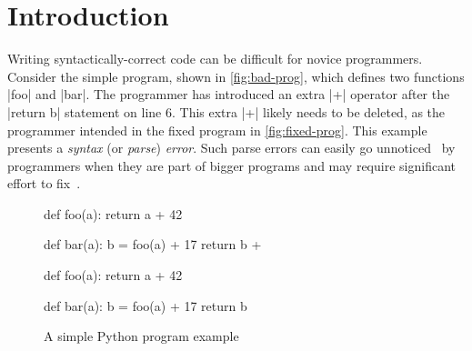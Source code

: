 \section{Introduction}
\label{sec:intro}

Writing syntactically-correct code can be difficult for novice 
programmers. Consider the simple program,
shown in \autoref{fig:bad-prog}, which defines two functions |foo| and
|bar|. 
The programmer has introduced an extra |+| operator after the
|return b| statement on line 6. This extra |+| likely needs to be deleted, as the
programmer intended in the fixed program in \autoref{fig:fixed-prog}. This
example presents a \emph{syntax} (or \emph{parse}) \emph{error}. Such parse errors can easily
go unnoticed~\citep{Denny_2012, Ahadi_2018} by programmers when they are part of
bigger programs and may require significant effort to fix~\citep{Kummerfeld2003}.


\begin{figure}[h]
\centering
\begin{minipage}[c]{0.48\linewidth}
\begin{ecode}
def foo(a):
  return a + 42

def bar(a):
  b = foo(a) + 17
  return b +
\end{ecode}
\label{fig:bad-prog}
\end{minipage}%
\hspace{0.02\linewidth}%
\begin{minipage}[c]{0.48\linewidth}
\begin{ecode}
def foo(a):
  return a + 42

def bar(a):
  b = foo(a) + 17
  return b
\end{ecode}
\label{fig:fixed-prog}
\end{minipage}
\caption{A simple Python program example}
\label{fig:example-prog}
\end{figure}

